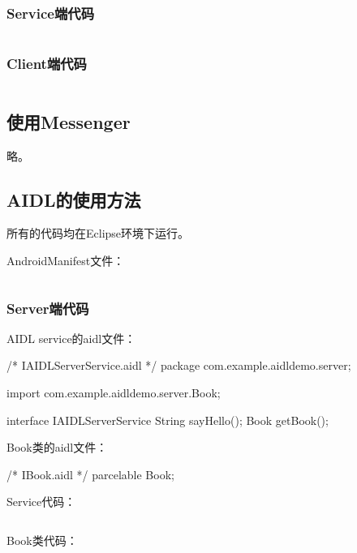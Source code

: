 ﻿\documentclass[a4paper,11pt]{article}
\begin{document}
  \subsubsection[Service端代码]{Service端代码}
  \inputminted[linenos,tabsize=4,bgcolor=srcbg]{java}{srcdir/LocalService.java}

  \subsubsection[Client端代码]{Client端代码}
  \inputminted[linenos,tabsize=4,bgcolor=srcbg]{java}{srcdir/BindingActivity.java}

  \subsection[使用Messenger]{使用Messenger}
  略。

  \subsection[AIDL的使用方法]{AIDL的使用方法}
  所有的代码均在Eclipse环境下运行。\par\bigskip
  AndroidManifest文件：\par
  \inputminted[linenos,tabsize=4,bgcolor=srcbg]{xml}{srcdir/AIDLManifest.xml}

  \subsubsection[Server端代码]{Server端代码}
  AIDL service的aidl文件：\par
  \begin{javacode}
/* IAIDLServerService.aidl */
package com.example.aidldemo.server;

import com.example.aidldemo.server.Book;

interface IAIDLServerService {
    String sayHello();
    Book getBook();
}
  \end{javacode}

  Book类的aidl文件：\par
  \begin{javacode}
/* IBook.aidl */
parcelable Book;
  \end{javacode}

  Service代码：\par
  \inputminted[linenos,tabsize=4,bgcolor=srcbg]{java}{srcdir/AIDLServerService.java}

  Book类代码：\par
  \inputminted[linenos,tabsize=4,bgcolor=srcbg]{java}{srcdir/Book.java}
\end{document}
